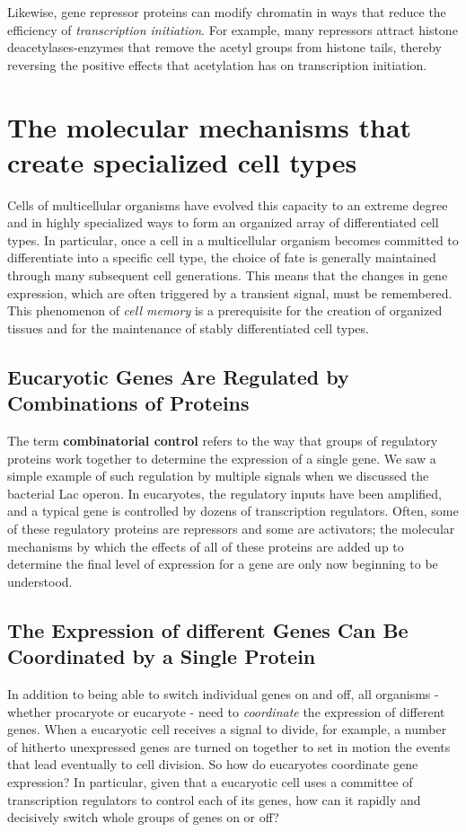 Likewise, gene repressor proteins can modify chromatin in ways that
reduce the efficiency of \textit{transcription initiation}. For example, many repressors
attract histone deacetylases-enzymes that remove the acetyl groups
from histone tails, thereby reversing the positive effects that acetylation
has on transcription initiation.

\section{The molecular mechanisms that create specialized cell types}

Cells of multicellular organisms have evolved
this capacity to an extreme degree and in highly specialized ways to form
an organized array of differentiated cell types. In particular, once a cell in a
multicellular organism becomes committed to differentiate into a specific
cell type, the choice of fate is generally maintained through many subsequent
cell generations. This means that the changes in gene expression,
which are often triggered by a transient signal, must be remembered. This
phenomenon of \textit{cell memory} is a prerequisite for the creation of organized
tissues and for the maintenance of stably differentiated cell types.

\subsection{Eucaryotic Genes Are Regulated by Combinations of Proteins}

The term \textbf{combinatorial control} refers to the way that groups of regulatory
proteins work together to determine the expression of a single gene.
We saw a simple example of such regulation by multiple signals when
we discussed the bacterial Lac operon. In eucaryotes, the
regulatory inputs have been amplified, and a typical gene is controlled
by dozens of transcription regulators. Often, some of these
regulatory proteins are repressors and some are activators; the molecular
mechanisms by which the effects of all of these proteins are added up to
determine the final level of expression for a gene are only now beginning
to be understood.

\subsection{The Expression of different Genes Can Be Coordinated by a Single Protein}

In addition to being able to switch individual genes on and off, all
organisms - whether procaryote or eucaryote - need to \textit{coordinate} the
expression of different genes. When a eucaryotic cell receives a signal to
divide, for example, a number of hitherto unexpressed genes are turned
on together to set in motion the events that lead eventually to cell division.
So how do eucaryotes coordinate gene expression? In particular, given that a eucaryotic
cell uses a committee of transcription regulators to control each of its genes,
how can it rapidly and decisively switch whole groups of genes on or off?

